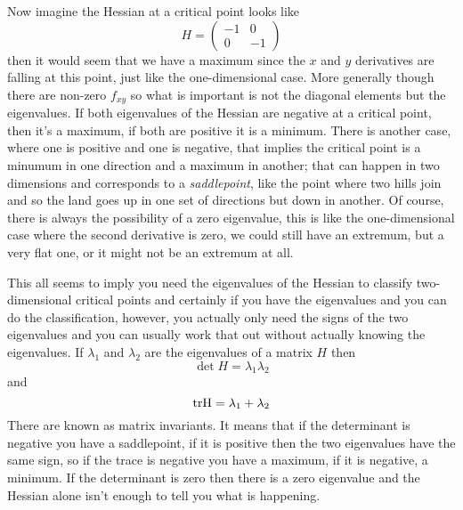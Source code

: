 \documentclass[12pt]{article}
\begin{document}
Now imagine the Hessian at a critical point looks like
\begin{equation}
  H=\left(\begin{array}{cc}-1&0\\0&-1\end{array}\right)
\end{equation}
then it would seem that we have a maximum since the $x$ and $y$
derivatives are falling at this point, just like the one-dimensional
case. More generally though there are non-zero $f_{xy}$ so what is
important is not the diagonal elements but the eigenvalues. If both
eigenvalues of the Hessian are negative at a critical point, then it's
a maximum, if both are positive it is a minimum. There is another
case, where one is positive and one is negative, that implies the
critical point is a minumum in one direction and a maximum in another;
that can happen in two dimensions and corresponds to a
\textsl{saddlepoint}, like the point where two hills join and so the
land goes up in one set of directions but down in another. Of course,
there is always the possibility of a zero eigenvalue, this is like the
one-dimensional case where the second derivative is zero, we could
still have an extremum, but a very flat one, or it might not be an
extremum at all.

This all seems to imply you need the eigenvalues of the Hessian to
classify two-dimensional critical points and certainly if you have the
eigenvalues and you can do the classification, however, you actually
only need the signs of the two eigenvalues and you can usually work
that out without actually knowing the eigenvalues. If $\lambda_1$ and
$\lambda_2$ are the eigenvalues of a matrix $H$ then
\begin{equation}
  \det{H}=\lambda_1\lambda_2
\end{equation}
and
\begin{equation}
  \rm{tr}{H}=\lambda_1+\lambda_2
\end{equation}
There are known as matrix invariants. It means that if the determinant
is negative you have a saddlepoint, if it is positive then the two
eigenvalues have the same sign, so if the trace is negative you have a
maximum, if it is negative, a minimum. If the determinant is zero then
there is a zero eigenvalue and the Hessian alone isn't enough to tell
you what is happening.
\end{document}
